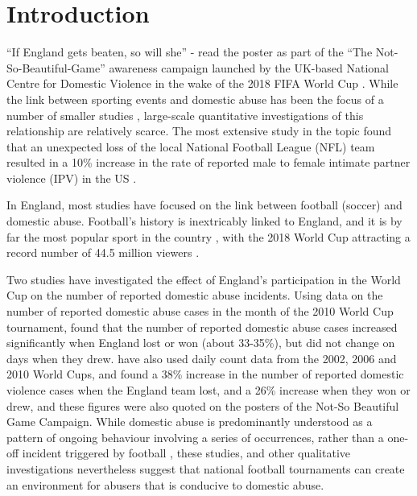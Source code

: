 \documentclass[12pt, a4paper]{article}
\begin{document}
\section*{Introduction}


``If England gets beaten, so will she'' - read the poster as part of the ``The Not-So-Beautiful-Game'' awareness campaign launched by the UK-based National Centre for Domestic Violence in the wake of the 2018 FIFA World Cup \cite{NCDV}. While the link between sporting events and domestic abuse has been the focus of a number of smaller studies \cite{Williams2014}, large-scale quantitative investigations of this relationship are relatively scarce. The most extensive study in the topic found that an unexpected loss of the local National Football League (NFL) team resulted in a 10\% increase in the rate of reported male to female intimate partner violence (IPV) in the US \cite{Card2011}. 

In England, most studies have focused on the link between football (soccer) and domestic abuse. Football's history is inextricably linked to England, and it is by far the most popular sport in the country \cite{Parry2014}, with the 2018 World Cup attracting a record number of 44.5 million viewers \cite{BBC}. 

Two studies have investigated the effect of England's participation in the World Cup on the number of reported domestic abuse incidents. Using data on the number of reported domestic abuse cases in the month of the 2010 World Cup tournament,  found that the number of reported domestic abuse cases increased significantly when England lost or won (about 33-35\%), but did not change on days when they drew.  have also used daily count data from the 2002, 2006 and 2010 World Cups, and found a 38\% increase in the number of reported domestic violence cases when the England team lost, and a 26\% increase when they won or drew, and these figures were also quoted on the posters of the Not-So Beautiful Game Campaign. While domestic abuse is predominantly understood as a pattern of ongoing behaviour involving a series of occurrences, rather than a one-off incident triggered by football \cite{Brooks-Hay2018}, these studies, and other qualitative investigations \cite{Swallow} nevertheless suggest that national football tournaments can create an environment for abusers that is conducive to domestic abuse.
\end{document}
